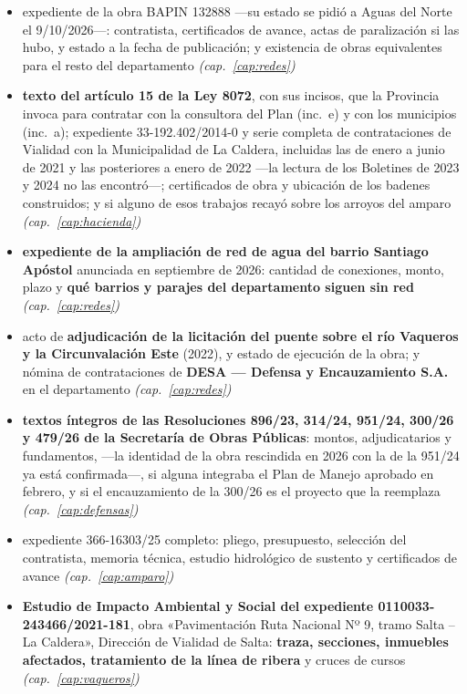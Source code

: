 \begin{itemize}[leftmargin=*]
\item expediente de la obra BAPIN 132888 ---su estado se pidió a Aguas del Norte el 9/10/2026---: contratista, certificados de avance, actas de paralización si las hubo, y estado a la fecha de publicación; y existencia de obras equivalentes para el resto del departamento \textit{(cap.\ \ref{cap:redes})}
\item \textbf{texto del artículo 15 de la Ley 8072}, con sus incisos, que la Provincia invoca para contratar con la consultora del Plan (inc.\ e) y con los municipios (inc.\ a); expediente 33-192.402/2014-0 y serie completa de contrataciones de Vialidad con la Municipalidad de La Caldera, incluidas las de enero a junio de 2021 y las posteriores a enero de 2022 ---la lectura de los Boletines de 2023 y 2024 no las encontró---; certificados de obra y ubicación de los badenes construidos; y si alguno de esos trabajos recayó sobre los arroyos del amparo \textit{(cap.\ \ref{cap:hacienda})}
\item \textbf{expediente de la ampliación de red de agua del barrio Santiago Apóstol} anunciada en septiembre de 2026: cantidad de conexiones, monto, plazo y \textbf{qué barrios y parajes del departamento siguen sin red} \textit{(cap.\ \ref{cap:redes})}
\item acto de \textbf{adjudicación de la licitación del puente sobre el río Vaqueros y la
Circunvalación Este} (2022), y estado de ejecución de la obra; y nómina de contrataciones de
\textbf{DESA --- Defensa y Encauzamiento S.A.} en el departamento \textit{(cap.\ \ref{cap:redes})}
\item \textbf{textos íntegros de las Resoluciones 896/23, 314/24, 951/24, 300/26 y 479/26 de la Secretaría de Obras Públicas}: montos, adjudicatarios y fundamentos, ---la identidad de la obra rescindida en 2026 con la de la 951/24 ya está confirmada---, si alguna integraba el Plan de Manejo aprobado en febrero, y si el encauzamiento de la 300/26 es el proyecto que la reemplaza \textit{(cap.\ \ref{cap:defensas})}
\item expediente 366-16303/25 completo: pliego, presupuesto, selección del contratista, memoria técnica, estudio hidrológico de sustento y certificados de avance \textit{(cap.\ \ref{cap:amparo})}
\item \textbf{Estudio de Impacto Ambiental y Social del expediente 0110033-243466/2021-181}, obra «Pavimentación Ruta Nacional Nº 9, tramo Salta -- La Caldera», Dirección de Vialidad de Salta: \textbf{traza, secciones, inmuebles afectados, tratamiento de la línea de ribera} y cruces de cursos \textit{(cap.\ \ref{cap:vaqueros})}

\end{itemize}
